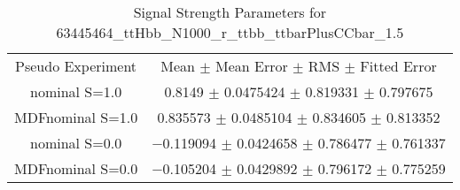 \begin{table}
\centering
\caption{Signal Strength Parameters for 63445464\_ttHbb\_N1000\_r\_ttbb\_ttbarPlusCCbar\_1.5}
\begin{tabular}{cc}
\toprule
Pseudo Experiment & Mean $\pm$ Mean Error $\pm$ RMS $\pm$ Fitted Error\\
nominal S=1.0 & \num{0.8149} $\pm$ \num{0.0475424} $\pm$ \num{0.819331} $\pm$ \num{0.797675}\\
MDFnominal S=1.0 & \num{0.835573} $\pm$ \num{0.0485104} $\pm$ \num{0.834605} $\pm$ \num{0.813352}\\
nominal S=0.0 & \num{-0.119094} $\pm$ \num{0.0424658} $\pm$ \num{0.786477} $\pm$ \num{0.761337}\\
MDFnominal S=0.0 & \num{-0.105204} $\pm$ \num{0.0429892} $\pm$ \num{0.796172} $\pm$ \num{0.775259}\\
\bottomrule
\end{tabular}
\end{table}